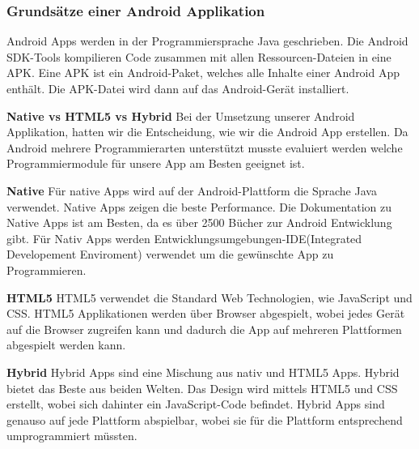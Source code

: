 
\subsubsection{Grundsätze einer Android Applikation}
\label{subsec:aapp-fundam}

Android Apps werden in der Programmiersprache Java geschrieben.
Die Android SDK-Tools kompilieren Code zusammen mit allen Ressourcen-Dateien in eine APK.
Eine APK ist ein Android-Paket, welches alle Inhalte einer Android App enthält. 
Die APK-Datei wird dann auf das Android-Gerät installiert. 


\textbf{Native vs HTML5 vs Hybrid}
Bei der Umsetzung unserer Android Applikation, hatten wir die Entscheidung, wie wir die Android App erstellen. 
Da Android mehrere Programmierarten unterstützt musste evaluiert werden welche Programmiermodule für unsere App am Besten geeignet ist. \nextline

\textbf{Native\newline} 
Für native Apps wird auf der Android-Plattform die Sprache Java verwendet.
Native Apps zeigen die beste Performance.
Die Dokumentation zu Native Apps ist am Besten, da es über 2500 Bücher zur Android Entwicklung gibt.
Für Nativ Apps werden Entwicklungsumgebungen-IDE(Integrated Developement Enviroment) verwendet um die gewünschte App zu Programmieren.\nextline

\textbf{HTML5\newline} 
HTML5 verwendet die Standard Web Technologien, wie JavaScript und CSS.
HTML5 Applikationen werden über Browser abgespielt, wobei jedes Gerät auf die Browser zugreifen kann und dadurch die App auf mehreren Plattformen abgespielt werden kann. \nextline

\textbf{Hybrid\newline} 
Hybrid Apps sind eine Mischung aus nativ und HTML5 Apps. Hybrid bietet das Beste aus beiden Welten. Das Design wird mittels HTML5 und CSS erstellt, wobei sich dahinter ein JavaScript-Code befindet. Hybrid Apps sind genauso auf jede Plattform abspielbar, wobei sie für die Plattform entsprechend umprogrammiert müssten.    
\nextline

\clearpage %